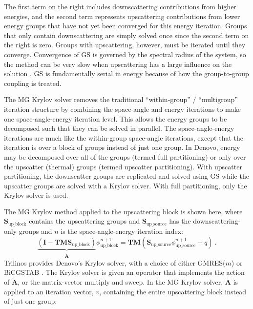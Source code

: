 \documentclass{article}                                                                           %
\newcommand{\ve}[1]{\ensuremath{\mathbf{#1}}}
\begin{document}
The first term on the right includes downscattering contributions from higher energies, and the second term represents upscattering contributions from lower energy groups that have not yet been converged for this energy iteration. Groups that only contain downscattering are simply solved once since the second term on the right is zero. Groups with upscattering, however, must be iterated until they converge. Convergence of GS is governed by the spectral radius of the system, so the method can be very slow when upscattering has a large influence on the solution \cite{Adams2002}. GS is fundamentally serial in energy because of how the group-to-group coupling is treated. 

The MG Krylov solver removes the traditional ``within-group'' / ``multigroup'' iteration structure by combining the space-angle and energy iterations to make one space-angle-energy iteration level. This allows the energy groups to be decomposed such that they can be solved in parallel. The space-angle-energy iterations are much like the within-group space-angle iterations, except that the iteration is over a block of groups instead of just one group.  In Denovo, energy may be decomposed over all of the groups (termed full partitioning) or only over the upscatter (thermal) groups (termed upscatter partitioning). With upscatter partitioning, the downscatter groups are replicated and solved using GS while the upscatter groups are solved with a Krylov solver. With full partitioning, only the Krylov solver is used.

The MG Krylov method applied to the upscattering block is shown here, where $\ve{S}_{\text{up\_block}}$ contains the upscattering groups and $\ve{S}_{\text{up\_source}}$ has the downscattering-only groups and $n$ is the space-angle-energy iteration index:
%
\begin{equation}
  \underbrace{(\ve{I} - \ve{TMS}_{\text{up\_block}})}_{\tilde{\ve{A}}}\phi_{\text{up\_block}}^{n+1} = \ve{TM}(\ve{S}_{\text{up\_source}}\phi_{\text{up\_source}}^{n+1} + q) \:.
  \label{eq:MGkrylov}
\end{equation}
%
Trilinos \cite{1089021} provides Denovo's Krylov solver, with a choice of either GMRES($m$) or BiCGSTAB \cite{Evans2010}. The Krylov solver is given an operator that implements the action of $\ve{\tilde{A}}$, or the matrix-vector multiply and sweep. In the MG Krylov solver, $\ve{\tilde{A}}$ is applied to an iteration vector, $v$, containing the entire upscattering block instead of just one group.%
%
\end{document}
